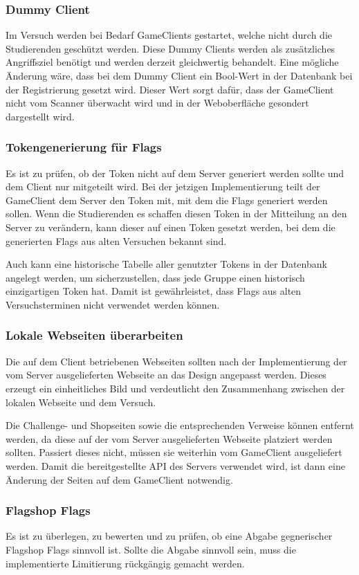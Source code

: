 \subsubsection{Dummy Client}
Im Versuch werden bei Bedarf GameClients gestartet, welche nicht durch die Studierenden geschützt werden. Diese Dummy Clients werden als zusätzliches Angriffsziel benötigt und werden derzeit gleichwertig behandelt. Eine mögliche Änderung wäre, dass bei dem Dummy Client ein Bool-Wert in der Datenbank bei der Registrierung gesetzt wird. Dieser Wert sorgt dafür, dass der GameClient nicht vom Scanner überwacht wird und in der Weboberfläche gesondert dargestellt wird.

\subsubsection{Tokengenerierung für Flags}
Es ist zu prüfen, ob der Token nicht auf dem Server generiert werden sollte und dem Client nur mitgeteilt wird. Bei der jetzigen Implementierung teilt der GameClient dem Server den Token mit, mit dem die Flags generiert werden sollen. Wenn die   Studierenden es schaffen diesen Token in der Mitteilung an den Server zu verändern, kann dieser auf einen Token gesetzt werden, bei dem die generierten Flags aus alten Versuchen bekannt sind.

Auch kann eine historische Tabelle aller genutzter Tokens in der Datenbank angelegt werden, um sicherzustellen, dass jede Gruppe einen historisch einzigartigen Token hat. Damit ist gewährleistet, dass Flags aus alten Versuchsterminen nicht verwendet werden können.

\subsubsection{Lokale Webseiten überarbeiten}
Die auf dem Client betriebenen Webseiten sollten nach der Implementierung der vom Server ausgelieferten Webseite an das Design angepasst werden. Dieses erzeugt ein einheitliches Bild und verdeutlicht den Zusammenhang zwischen der lokalen Webseite und dem Versuch.

Die Challenge- und Shopseiten sowie die entsprechenden Verweise können entfernt werden, da diese auf der vom Server ausgelieferten Webseite platziert werden sollten. Passiert dieses nicht, müssen sie weiterhin vom GameClient ausgeliefert werden. Damit die bereitgestellte API des Servers verwendet wird, ist dann eine Änderung der Seiten auf dem GameClient notwendig.

\subsubsection{Flagshop Flags}
Es ist zu überlegen, zu bewerten und zu prüfen, ob eine Abgabe gegnerischer Flagshop Flags sinnvoll ist. Sollte die Abgabe sinnvoll sein, muss die implementierte Limitierung rückgängig gemacht werden.